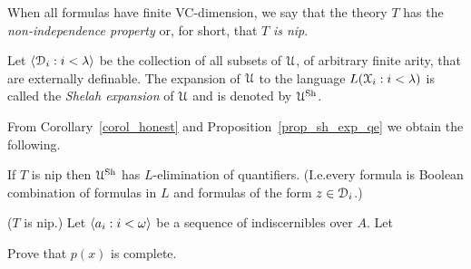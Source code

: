 When all formulas have finite VC-dimension, we say that the theory $T$ has the \emph{non-independence property\/} or, for short, that $T$ \emph{is nip}.

Let $\langle\EuScript D_i:i<\lambda\rangle$ be the collection of all subsets of $\EuScript U$, of arbitrary finite arity, that are externally definable. The expansion of $\EuScript U$ to the language $L(\EuScript X_i:i<\lambda)$ is called the \emph{Shelah expansion\/} of $\EuScript U$ and is denoted by \emph{$\EuScript U^{\rm Sh}$}. 

From Corollary~\ref{corol_honest} and Proposition~\ref{prop_sh_exp_qe} we obtain the following.

\begin{corollary}\label{corol_sh_exp_qe}
If $T$ is nip then $\EuScript U^{\rm Sh}$ has $L$-elimination of quantifiers. (I.e.\@ every formula is Boolean combination of formulas in $L$ and formulas of the form $z\in\EuScript D_i$.)
\end{corollary}

\begin{exercise}
  ($T$ is nip.)
  Let $\langle a_i:i<\omega\rangle$ be a sequence of indiscernibles over $A$.
  Let 
  

  Prove that $p(x)$ is complete.
\end{exercise}


